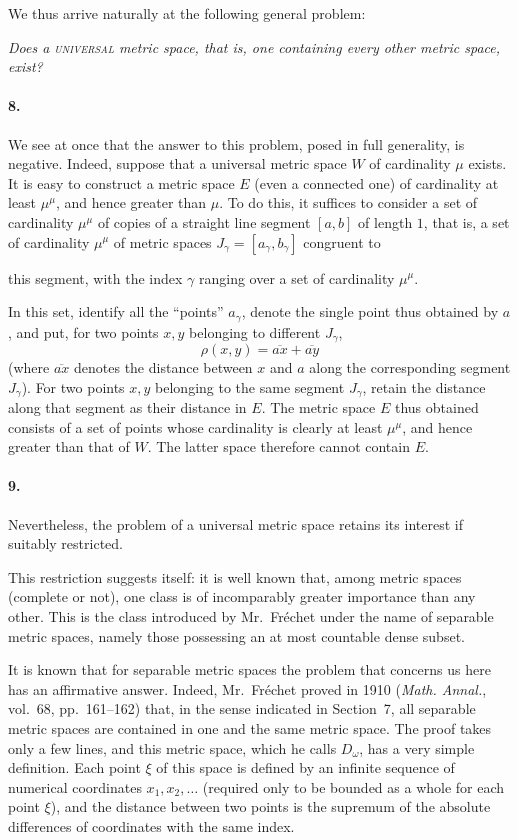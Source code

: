 \documentclass[a4paper,12pt]{amsart}
\newcommand{\srcpage}[1]{} %
\begin{document}
We thus arrive naturally at the following general problem:

\textit{Does a \textup{\textsc{universal}} metric space, that is, one containing every other metric space, exist?}

\paragraph{8.}
We see at once that the answer to this problem, posed in full generality, is negative. Indeed, suppose that a universal metric space $W$ of cardinality $\mu$ exists. It is easy to construct a metric space $E$ (even a connected one) of cardinality at least $\mu^{\mu}$, and hence greater than $\mu$. To do this, it suffices to consider a set of cardinality $\mu^{\mu}$ of copies of a straight line segment $[a,b]$ of length $1$, that is, a set of cardinality $\mu^{\mu}$ of metric spaces $J_\gamma=[a_\gamma,b_\gamma]$ congruent to
\srcpage{51}
this segment, with the index $\gamma$ ranging over a set of cardinality $\mu^{\mu}$.

In this set, identify all the ``points'' $a_\gamma$, denote the single point thus obtained by $a$, and put, for two points $x,y$ belonging to different $J_\gamma$,
\[
\rho(x,y)=\overline{ax}+\overline{ay}
\]
(where $\overline{ax}$ denotes the distance between $x$ and $a$ along the corresponding segment $J_\gamma$). For two points $x,y$ belonging to the same segment $J_\gamma$, retain the distance along that segment as their distance in $E$. The metric space $E$ thus obtained consists of a set of points whose cardinality is clearly at least $\mu^{\mu}$, and hence greater than that of $W$. The latter space therefore cannot contain $E$.

\paragraph{9.}
Nevertheless, the problem of a universal metric space retains its interest if suitably restricted.

This restriction suggests itself: it is well known that, among metric spaces (complete or not), one class is of incomparably greater importance than any other. This is the class introduced by Mr.~Fréchet under the name of separable metric spaces, namely those possessing an at most countable dense subset.

It is known that for separable metric spaces the problem that concerns us here has an affirmative answer. Indeed, Mr.~Fréchet proved in 1910 (\textit{Math. Annal.}, vol.~68, pp.~161--162) that, in the sense indicated in Section~7, all separable metric spaces are contained in one and the same metric space. The proof takes only a few lines, and this metric space, which he calls $D_\omega$, has a very simple definition. Each point $\xi$ of this space is defined by an infinite sequence of numerical coordinates $x_1,x_2,\dots$ (required only to be bounded as a whole for each point $\xi$), and the distance between two points is the supremum of the absolute differences of coordinates with the same index.
\end{document}
